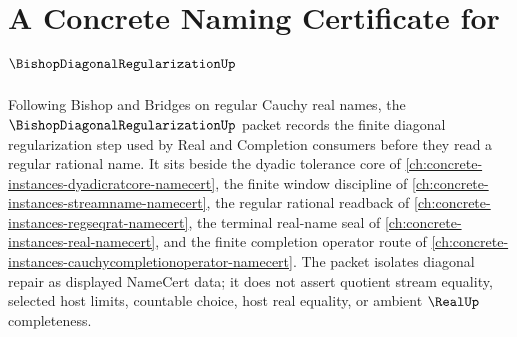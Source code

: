 \chapter{A Concrete Naming Certificate for $\BishopDiagonalRegularizationUp$}
\label{ch:concrete-instances-bishop-diagonal-regularization-namecert}

Following Bishop and Bridges on regular Cauchy real names, the $\BishopDiagonalRegularizationUp$ packet records the finite diagonal regularization step used by Real and Completion consumers before they read a regular rational name. It sits beside the dyadic tolerance core of \autoref{ch:concrete-instances-dyadicratcore-namecert}, the finite window discipline of \autoref{ch:concrete-instances-streamname-namecert}, the regular rational readback of \autoref{ch:concrete-instances-regseqrat-namecert}, the terminal real-name seal of \autoref{ch:concrete-instances-real-namecert}, and the finite completion operator route of \autoref{ch:concrete-instances-cauchycompletionoperator-namecert}. The packet isolates diagonal repair as displayed NameCert data; it does not assert quotient stream equality, selected host limits, countable choice, host real equality, or ambient $\RealUp$ completeness.

